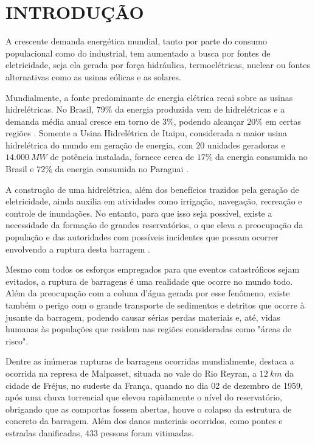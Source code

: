 

\chapter[INTRODUÇÃO]{INTRODUÇÃO}

A crescente demanda energética mundial, tanto por parte do consumo populacional como do industrial, tem aumentado a busca por fontes de eletricidade, seja ela gerada por força hidráulica, termoelétricas, nuclear ou fontes alternativas como as usinas eólicas e as solares.

Mundialmente, a fonte predominante de energia elétrica recai sobre as usinas hidrelétricas. No Brasil, $79\%$ da energia produzida vem de hidrelétricas e a demanda média anual cresce em torno de $3\%$, podendo alcançar $20 \%$ em certas regiões \cite{BEN}. Somente a Usina Hidrelétrica de Itaipu, considerada a maior usina hidrelétrica do mundo em geração de energia, com  $20$ unidades geradoras e $14.000 \ MW$ de potência instalada, fornece cerca de $17 \%$ da energia consumida no Brasil e $72 \%$ da energia consumida no Paraguai \cite{ITAIPU}.

A construção de uma hidrelétrica, além dos benefícios trazidos pela geração de eletricidade, ainda auxilia em atividades como irrigação, navegação, recreação e controle de inundações. No entanto, para que isso seja possível, existe a necessidade da formação de grandes reservatórios, o que eleva a preocupação da população e das autoridades com possíveis incidentes que possam ocorrer envolvendo a ruptura desta barragem \cite{Rafael}.

Mesmo com todos os esforços empregados para que eventos catastróficos sejam evitados, a ruptura de barragens é uma realidade que ocorre no mundo todo. Além da preocupação com a coluna d'água gerada por esse fenômeno, existe também o perigo com o grande transporte de sedimentos e detritos que ocorre à jusante da barragem, podendo causar sérias perdas materiais e, até, vidas humanas às populações que residem nas regiões consideradas como "áreas de risco".

Dentre as inúmeras rupturas de barragens ocorridas mundialmente,  destaca a ocorrida na represa de Malpasset, situada no vale do Rio Reyran, a $12 \ km$ da cidade de Fréjus, no sudeste da França, quando no dia 02 de dezembro de 1959, após uma chuva torrencial que elevou rapidamente o nível do reservatório, obrigando que as comportas fossem abertas, houve o colapso da estrutura de concreto da barragem. Além dos danos materiais ocorridos, como pontes e estradas danificadas, $433$ pessoas foram vitimadas.

